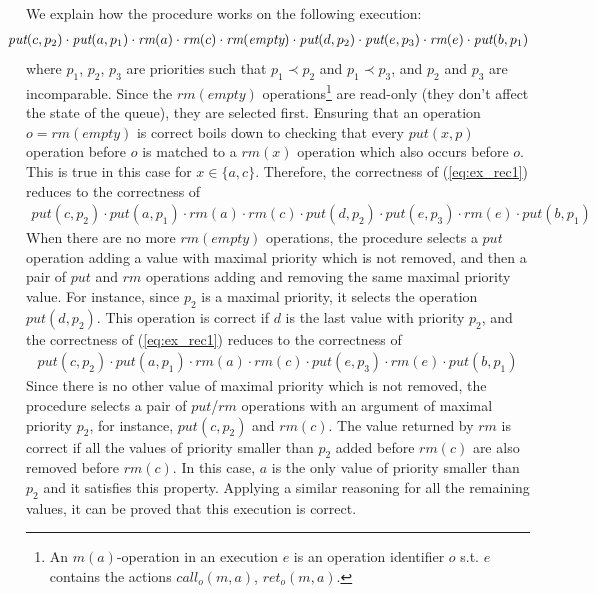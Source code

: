 We explain how the procedure works on the following execution:
\begin{align}
\hspace{-5mm}\textit{put}(c,p_2) \cdot \textit{put}(a,p_1) \cdot \textit{rm}(a) \cdot \textit{rm}(c) \cdot \textit{rm}(\textit{empty}) \cdot \textit{put}(d,p_2) \cdot \textit{put}(e,p_3) \cdot \textit{rm}(e) \cdot \textit{put}(b,p_1)\label{eq:ex_rec1}
\end{align}
where $p_1$, $p_2$, $p_3$ are priorities such that $p_1 \prec p_2$ and $p_1 \prec p_3$, and $p_2$ and $p_3$ are incomparable. Since the $\textit{rm}(\textit{empty})$ operations\footnote{An $m(a)$-operation in an execution $e$ is an operation identifier $o$ s.t. $e$ contains the actions $\textit{call}_o(m,a)$, $\textit{ret}_o(m,a)$.} are read-only (they don't affect the state of the queue), they are selected first. Ensuring that an operation $o=\textit{rm}(\textit{empty})$ is correct boils down to checking that every $\textit{put}(x,p)$ operation before $o$ is matched to a $\textit{rm}(x)$ operation which also occurs before $o$. This is true in this case for $x\in \{a,c\}$. Therefore, the correctness of (\ref{eq:ex_rec1}) reduces to the correctness of
\begin{align*}
\textit{put}(c,p_2) \cdot \textit{put}(a,p_1) \cdot \textit{rm}(a) \cdot \textit{rm}(c) \cdot \textit{put}(d,p_2) \cdot \textit{put}(e,p_3) \cdot \textit{rm}(e) \cdot \textit{put}(b,p_1)
\end{align*}
When there are no more $\textit{rm}(\textit{empty})$ operations, the procedure selects a $\textit{put}$ operation adding a value with maximal priority which is not removed, and then a pair of $\textit{put}$ and $\textit{rm}$ operations adding and removing the same maximal priority value. For instance, since $p_2$ is a maximal priority, it selects the operation $\textit{put}(d,p_2)$. {This operation is correct if $d$ is the last value with priority $p_2$, and the correctness of (\ref{eq:ex_rec1}) reduces to the correctness of
\begin{align*}
\textit{put}(c,p_2) \cdot \textit{put}(a,p_1) \cdot \textit{rm}(a) \cdot \textit{rm}(c) \cdot \textit{put}(e,p_3) \cdot \textit{rm}(e) \cdot \textit{put}(b,p_1)
\end{align*}
Since there is no other value of maximal priority which is not removed, the procedure selects a pair of $\textit{put}$/$\textit{rm}$ operations with an argument of maximal priority $p_2$,} for instance, $\textit{put}(c,p_2)$ and $\textit{rm}(c)$. The value returned by $\textit{rm}$ is correct if all the values of priority smaller than $p_2$ added before $\textit{rm}(c)$ are also removed before $\textit{rm}(c)$. In this case, $a$ is the only value of priority smaller than $p_2$ and it satisfies this property. Applying a similar reasoning for all the remaining values, it can be proved that this execution is correct.

